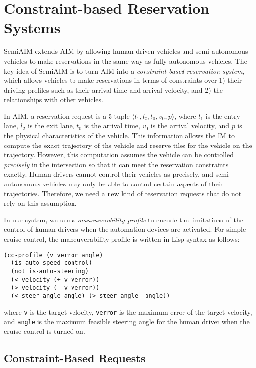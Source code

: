 \section{Constraint-based Reservation Systems}
\label{sec:constraint}

SemiAIM extends AIM by allowing human-driven vehicles and
semi-autonomous vehicles to make reservations in the same way as
fully autonomous vehicles.  The key idea of SemiAIM is to turn AIM into a
\emph{constraint-based reservation system}, which allows vehicles to
make reservations in terms of constraints over 1) their driving
profiles such as their arrival time and arrival velocity, and 2) the
relationships with other vehicles.

In AIM, a reservation request is a $5$-tuple $\langle l_1, l_2, t_0,
v_0, p\rangle$, where $l_1$ is the entry lane, $l_2$ is the exit lane,
$t_0$ is the arrival time, $v_0$ is the arrival velocity, and $p$ is
the physical characteristics of the vehicle.  This information allows
the IM to compute the exact trajectory of the vehicle and reserve
tiles for the vehicle on the trajectory.  However, this computation
assumes the vehicle can be controlled \emph{precisely} in the
intersection so that it can meet the reservation constraints exactly.
Human drivers cannot control their vehicles as precisely, and
semi-autonomous vehicles may only be able to control certain aspects
of their trajectories.  Therefore, we need a new kind of reservation
requests that do not rely on this assumption.

In our system, we use a
\emph{maneuverability profile} to encode the limitations of the
control of human drivers when the automation devices are activated.
For simple cruise control, the maneuverability profile is written in
Lisp syntax as follows:
\begin{small}
\begin{verbatim}
(cc-profile (v verror angle)
  (is-auto-speed-control)
  (not is-auto-steering)
  (< velocity (+ v verror))
  (> velocity (- v verror))
  (< steer-angle angle) (> steer-angle -angle))
\end{verbatim}
\end{small}
\noindent
where \texttt{v} is the target velocity, \texttt{verror} is the
maximum error of the target velocity, and \texttt{angle} is the
maximum feasible steering angle for the human driver when the cruise
control is turned on.

\subsection{Constraint-Based Requests}

